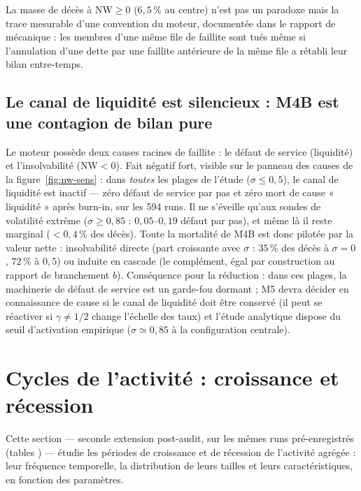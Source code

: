 \documentclass[11pt,a4paper]{article}
\newcommand{\NW}{\mathrm{NW}}
\begin{document}
La masse de décès à $\NW\ge0$ ($6{,}5\,\%$ au centre) n'est pas un
paradoxe mais la trace mesurable d'une convention du moteur, documentée
dans le rapport de mécanique : les membres d'une même file de faillite
sont tués même si l'annulation d'une dette par une faillite antérieure
de la même file a rétabli leur bilan entre-temps.

\subsection{Le canal de liquidité est silencieux : M4B est une
contagion de bilan pure}

Le moteur possède deux causes racines de faillite : le défaut de
service (liquidité) et l'insolvabilité ($\NW<0$). Fait négatif fort,
visible sur le panneau des causes de la figure~\ref{fig:nw-sens} : dans
\emph{toutes} les plages de l'étude ($\sigma\le0{,}5$), le canal de
liquidité est inactif — zéro défaut de service par pas et zéro mort de
cause « liquidité » après burn-in, sur les 594 runs. Il ne s'éveille
qu'aux sondes de volatilité extrême ($\sigma\ge0{,}85$ :
$0{,}05$--$0{,}19$ défaut par pas), et même là il reste marginal
($<0{,}4\,\%$ des décès). Toute la mortalité de M4B est donc pilotée
par la valeur nette : insolvabilité directe (part croissante avec
$\sigma$ : $35\,\%$ des décès à $\sigma=0$, $72\,\%$ à $0{,}5$) ou
induite en cascade (le complément, égal par construction au rapport de
branchement $b$). Conséquence pour la réduction : dans ces plages, la
machinerie de défaut de service est un garde-fou dormant ; M5 devra
décider en connaissance de cause si le canal de liquidité doit être
conservé (il peut se réactiver si $\gamma\ne1/2$ change l'échelle des
taux) et l'étude analytique dispose du seuil d'activation empirique
($\sigma\simeq0{,}85$ à la configuration centrale).

\section{Cycles de l'activité : croissance et récession}
\label{sec:cycles}

Cette section — seconde extension post-audit, sur les mêmes runs
pré-enregistrés (tables ) — étudie
les périodes de croissance et de récession de l'activité agrégée : leur
fréquence temporelle, la distribution de leurs tailles et leurs
caractéristiques, en fonction des paramètres.
\end{document}
